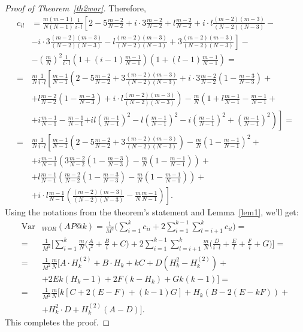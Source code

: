 \documentclass[10pt,a4paper]{amsart}
\begin{document}
\begin{proof}[Proof of Theorem~\ref {th2wor}]
Therefore, 
\begin{equation*}
\begin{split}
c_{i l} & = \frac{m(m-1)}{N(N-1)}\frac{1}{i\cdot l}\left[2-5\frac{m-2}{N-2}+i\cdot 3\frac{m-2}{N-2}+l\frac{m-2}{N-2}+i\cdot l\frac{(m-2)(m-3)}{(N-2)(N-3)}- \right.\\
&\left.-i\cdot 3\frac{(m-2)(m-3)}{(N-2)(N-3)}-l\frac{(m-2)(m-3)}{(N-2)(N-3)}+3\frac{(m-2)(m-3)}{(N-2)(N-3)}\right]-\\
&-\left(\frac{m}{N}\right)^2\frac{1}{i\cdot l}\left(1+(i-1)\frac{m-1}{N-1}\right)\left(1+(l-1)\frac{m-1}{N-1}\right)=\\
= & \frac{m}{N}\frac{1}{i\cdot l}\left[\frac{m-1}{N-1}\left(2-5\frac{m-2}{N-2}+3\frac{(m-2)(m-3)}{(N-2)(N-3)}+i\cdot 3\frac{m-2}{N-2}\left(1-\frac{m-3}{N-3}\right)+ \right.\right.\\
&\left. +l\frac{m-2}{N-2}\left(1-\frac{m-3}{N-3}\right)+i\cdot l\frac{(m-2)(m-3)}{(N-2)(N-3)}\right)-\frac{m}{N}\left(1+l\frac{m-1}{N-1}-\frac{m-1}{N-1}+ \right.\\
&+i\frac{m-1}{N-1}-\frac{m-1}{N-1} \left.\left.+il\left(\frac{m-1}{N-1}\right)^2-l\left(\frac{m-1}{N-1}\right)^2-i\left(\frac{m-1}{N-1}\right)^2+\left(\frac{m-1}{N-1}\right)^2\right)\right]=\\
= &\frac{m}{N}\frac{1}{i\cdot l}\left[\frac{m-1}{N-1}\left(2-5\frac{m-2}{N-2}+3\frac{(m-2)(m-3)}{(N-2)(N-3)}\right)-\frac{m}{N}\left(1-\frac{m-1}{N-1}\right)^2+ \right.\\
&+i\frac{m-1}{N-1}\left(3\frac{m-2}{N-2}\left(1-\frac{m-3}{N-3}\right)-\frac{m}{N}\left(1-\frac{m-1}{N-1}\right)\right)+\\
&+ l\frac{m-1}{N-1}\left(\frac{m-2}{N-2}\left(1-\frac{m-3}{N-3}\right)-\frac{m}{N}\left(1-\frac{m-1}{N-1}\right)\right)+\\
&+ \left. i\cdot l\frac{m-1}{N-1}\left(\frac{(m-2)(m-3)}{(N-2)(N-3)}-\frac{m}{N}\frac{m-1}{N-1}\right)\right].
\end{split}
\end{equation*}
Using the notations from the theorem's statement and  Lemma~\ref{lem1},  we'll get:
\begin{equation*}
\begin{split}
\operatorname{Var}&_{WOR}(AP@k)= \frac{1}{M^2} \Bigg( \sum_{i=1}^{k}c_{ii} + 2\sum_{i=1}^{k-1}\sum_{l=i+1}^{k}c_{il} \Bigg) =
\\
= &  \frac{1}{M^2} \Bigg[\sum_{i=1}^{k}\frac{m}{N}\Bigg(\frac{A}{i^2}+\frac{B}{i}+C \Bigg)+2\sum_{i=1}^{k-1}\sum_{l=i+1}^{k}\frac{m}{N}\Bigg(\frac{D}{i\cdot l}+\frac{E}{l}+\frac{F}{i}+G \Bigg) \Bigg] =
\\
= & \frac{1}{M^2} \frac{m}{N}\Bigg[ A \cdot H_k^{\left(2\right)} + B \cdot H_k + kC + D(H_k^2 - H_k^{\left(2\right)})  +\\
& +   2Ek(H_k-1) + 2F(k-H_k) + Gk(k-1) \Bigg] =
\\
= & \frac{1}{M^2} \frac{m}{N}\Bigg[ k[C+2(E-F) + (k-1)G] + H_k(B-2(E-kF))+\\
&+ H_k^2 \cdot D + H_k^{\left(2\right)}(A-D) \Bigg]. 
\end{split}
\end{equation*}
This completes the proof.
\end{proof}
\end{document}

